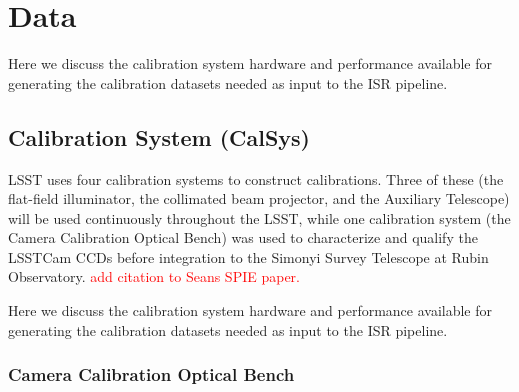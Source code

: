 \section{Data}\label{sec:data}
Here we discuss the calibration system hardware and performance available for generating the calibration datasets needed as input to the ISR pipeline.

\subsection{Calibration System (CalSys)}\label{sec:data:calsys}

LSST uses four calibration systems to construct calibrations. Three of these (the flat-field illuminator, the collimated beam projector, and the Auxiliary Telescope) will be used continuously throughout the LSST, while one calibration system (the Camera Calibration Optical Bench) was used to characterize and qualify the LSSTCam CCDs before integration to the Simonyi Survey Telescope at Rubin Observatory.
\textcolor{red}{add citation to Seans SPIE paper.}

Here we discuss the calibration system hardware and performance available for generating the calibration datasets needed as input to the ISR pipeline.

\subsubsection{Camera Calibration Optical Bench}\label{sec:data:calsys:ccob}

